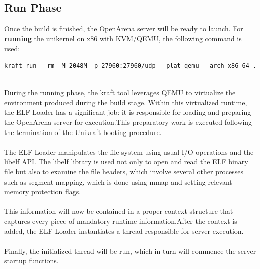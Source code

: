 \subsection{Run Phase}
Once the build is finished, the OpenArena server will be ready to launch. For \textbf{running} the unikernel on x86 with KVM/QEMU, the following command is used:
\\
\lstset{caption=Run the OpenArena server, language=C}
\begin{lstlisting}
kraft run --rm -M 2048M -p 27960:27960/udp --plat qemu --arch x86_64 .
\end{lstlisting}
\\
During the running phase, the kraft tool leverages QEMU to virtualize the environment produced during the build stage.\@
Within this virtualized runtime, the ELF Loader has a significant job: it is responsible for loading and preparing the OpenArena server for execution.\@ This preparatory work is executed following the termination of the Unikraft booting procedure. \\ \\
The ELF Loader manipulates the file system using usual I/O operations and the libelf API.
The libelf library is used not only to open and read the ELF binary file but also to examine the file headers, which involve several other processes such as segment mapping, which is done using mmap and setting relevant memory protection flags. \\ \\
This information will now be contained in a proper context structure that captures every piece of mandatory runtime information.\@ After the context is added, the ELF Loader instantiates a thread responsible for server execution. \\ \\
Finally, the initialized thread will be run, which in turn will commence the server startup functions.
